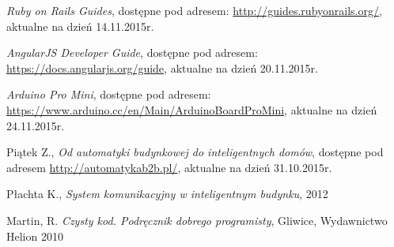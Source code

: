 \documentclass[eng,oneside]{mgr}
\begin{document}
\renewcommand\bibname{Literatura}
\begin{thebibliography}{inteligencja}
	
	\emph{Ruby on Rails Guides}, dostępne pod adresem: \url{http://guides.rubyonrails.org/},\\ aktualne na dzień 14.11.2015r.
	
	\emph{AngularJS Developer Guide}, dostępne pod adresem: \url{https://docs.angularjs.org/guide}, aktualne na dzień 20.11.2015r.

	\emph{Arduino Pro Mini}, dostępne pod adresem: \url{https://www.arduino.cc/en/Main/ArduinoBoardProMini}, aktualne na dzień 24.11.2015r.

	Piątek Z., \emph{Od automatyki budynkowej do inteligentnych domów}, dostępne pod adresem \url{http://automatykab2b.pl/}, aktualne na dzień 31.10.2015r.

	Płachta K., \emph{System komunikacyjny w inteligentnym budynku}, 2012

	Martin, R. \emph{Czysty kod. Podręcznik dobrego programisty}, Gliwice, Wydawnictwo Helion 2010
	
\end{thebibliography}
\end{document}
